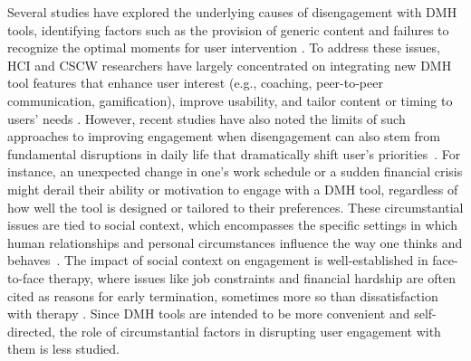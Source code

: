 Several studies have explored the underlying causes of disengagement with DMH tools, identifying factors such as the provision of generic content and failures to recognize the optimal moments for user intervention \cite{bhattacharjee2023investigating, rennick2016health, bhattacharjee2022design, kornfield2020energy}.
To address these issues, HCI and CSCW researchers have largely concentrated on integrating new DMH tool features that enhance user interest (e.g., coaching, peer-to-peer communication, gamification), improve usability, and tailor content or timing to users' needs \cite{saleem2021understanding, dwivedi2019re, borghouts2021barriers, kornfield2022involving, ng2019provider, yoo2024missed}. However, recent studies have also noted the limits of such %
approaches to improving engagement when disengagement can also stem from fundamental disruptions in daily life that dramatically shift user's priorities~\cite{lipschitz2023engagement, pendse2022treatment}. For instance, an unexpected change in one's work schedule or a sudden financial crisis might derail their ability or motivation to engage with a DMH tool, regardless of how well the tool is designed or tailored to their preferences. These circumstantial issues are tied to social context, which encompasses the specific settings in which human relationships and personal circumstances influence the way one thinks and behaves~\cite{dourish2004we, bronfenbrenner1977toward, helliwell2004social}. The impact of social context on engagement is well-established in face-to-face therapy, where issues like job constraints and financial hardship are often cited as reasons for early termination, sometimes more so than dissatisfaction with therapy  \cite{renk2002reasons, roe2006clients, hynan1990client}. Since DMH tools are intended to be more convenient and self-directed, the role of circumstantial factors in disrupting user engagement with them is less studied.

